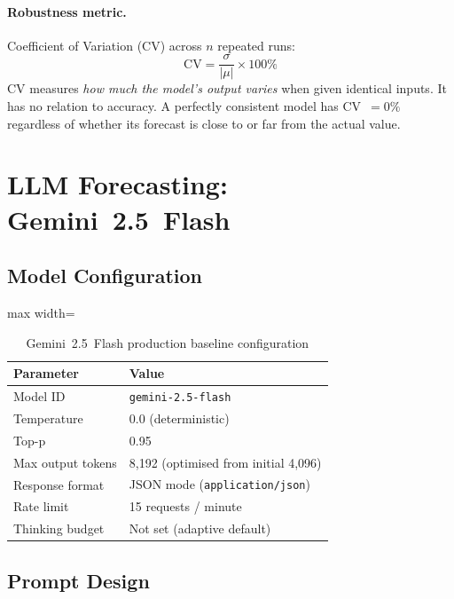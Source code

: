 \documentclass[11pt,a4paper]{article}
\begin{document}
\paragraph{Robustness metric.}  Coefficient of Variation (CV) across $n$ repeated runs:
\begin{equation}
  \text{CV} = \frac{\sigma}{\lvert\mu\rvert}\times100\%
  \label{eq:cv}
\end{equation}
CV measures \emph{how much the model's output varies} when given
identical inputs.  It has no relation to accuracy.
A perfectly consistent model has CV~$= 0\%$ regardless of whether its
forecast is close to or far from the actual value.

\section{LLM Forecasting: Gemini~2.5~Flash}

\subsection{Model Configuration}

\begin{table}[H]\centering
\caption{Gemini~2.5~Flash production baseline configuration}
\label{tab:config}
\begin{adjustbox}{max width=\textwidth}
\begin{tabular}{ll}\toprule
\textbf{Parameter} & \textbf{Value}\\\midrule
Model ID            & \texttt{gemini-2.5-flash}\\
Temperature         & 0.0 (deterministic)\\
Top-p               & 0.95\\
Max output tokens   & 8{,}192 (optimised from initial 4{,}096)\\
Response format     & JSON mode (\texttt{application/json})\\
Rate limit          & 15 requests / minute\\
Thinking budget     & Not set (adaptive default)\\
\bottomrule
\end{tabular}
\end{adjustbox}
\end{table}

\subsection{Prompt Design}
\end{document}
